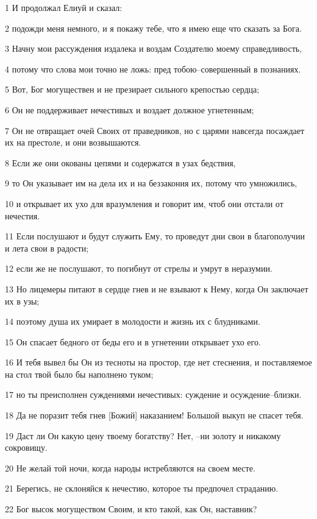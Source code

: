 \par 1 И продолжал Елиуй и сказал:
\par 2 подожди меня немного, и я покажу тебе, что я имею еще что сказать за Бога.
\par 3 Начну мои рассуждения издалека и воздам Создателю моему справедливость,
\par 4 потому что слова мои точно не ложь: пред тобою--совершенный в познаниях.
\par 5 Вот, Бог могуществен и не презирает сильного крепостью сердца;
\par 6 Он не поддерживает нечестивых и воздает должное угнетенным;
\par 7 Он не отвращает очей Своих от праведников, но с царями навсегда посаждает их на престоле, и они возвышаются.
\par 8 Если же они окованы цепями и содержатся в узах бедствия,
\par 9 то Он указывает им на дела их и на беззакония их, потому что умножились,
\par 10 и открывает их ухо для вразумления и говорит им, чтоб они отстали от нечестия.
\par 11 Если послушают и будут служить Ему, то проведут дни свои в благополучии и лета свои в радости;
\par 12 если же не послушают, то погибнут от стрелы и умрут в неразумии.
\par 13 Но лицемеры питают в сердце гнев и не взывают к Нему, когда Он заключает их в узы;
\par 14 поэтому душа их умирает в молодости и жизнь их с блудниками.
\par 15 Он спасает бедного от беды его и в угнетении открывает ухо его.
\par 16 И тебя вывел бы Он из тесноты на простор, где нет стеснения, и поставляемое на стол твой было бы наполнено туком;
\par 17 но ты преисполнен суждениями нечестивых: суждение и осуждение--близки.
\par 18 Да не поразит тебя гнев [Божий] наказанием! Большой выкуп не спасет тебя.
\par 19 Даст ли Он какую цену твоему богатству? Нет, --ни золоту и никакому сокровищу.
\par 20 Не желай той ночи, когда народы истребляются на своем месте.
\par 21 Берегись, не склоняйся к нечестию, которое ты предпочел страданию.
\par 22 Бог высок могуществом Своим, и кто такой, как Он, наставник?

